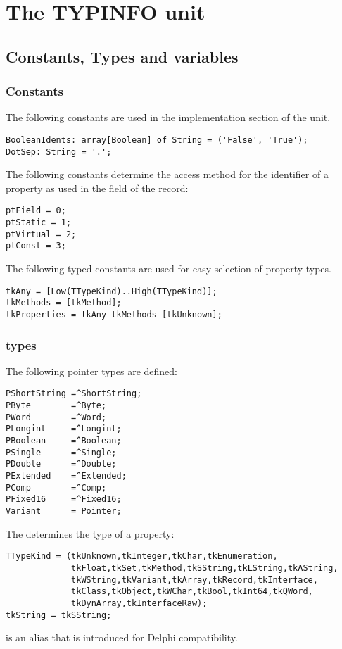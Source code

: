 \chapter{The TYPINFO unit}
\section{Constants, Types and variables}
\subsection{Constants}
The following constants are used in the implementation section of the unit.

\begin{verbatim}
BooleanIdents: array[Boolean] of String = ('False', 'True');
DotSep: String = '.';
\end{verbatim}
The following constants determine the access method for the  
identifier of a property as used in the  field of the 
 record:
\begin{verbatim}
ptField = 0;
ptStatic = 1;
ptVirtual = 2;
ptConst = 3;
\end{verbatim}
The following typed constants are used for easy selection of property types.
\begin{verbatim}
tkAny = [Low(TTypeKind)..High(TTypeKind)];
tkMethods = [tkMethod];
tkProperties = tkAny-tkMethods-[tkUnknown];
\end{verbatim}

\subsection{types}
The following pointer types are defined:
\begin{verbatim}
PShortString =^ShortString;
PByte        =^Byte;
PWord        =^Word;
PLongint     =^Longint;
PBoolean     =^Boolean;
PSingle      =^Single;
PDouble      =^Double;
PExtended    =^Extended;
PComp        =^Comp;
PFixed16     =^Fixed16;
Variant      = Pointer;
\end{verbatim}

The  determines the type of a property:
\begin{verbatim}
TTypeKind = (tkUnknown,tkInteger,tkChar,tkEnumeration,
             tkFloat,tkSet,tkMethod,tkSString,tkLString,tkAString,
             tkWString,tkVariant,tkArray,tkRecord,tkInterface,
             tkClass,tkObject,tkWChar,tkBool,tkInt64,tkQWord,
             tkDynArray,tkInterfaceRaw);
tkString = tkSString;
\end{verbatim}
 is an alias that is introduced for Delphi compatibility.

